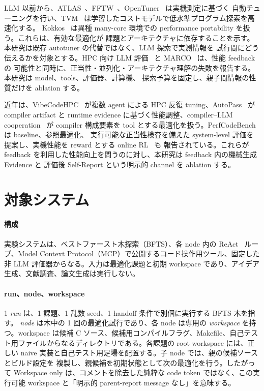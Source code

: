 \documentclass[conference,letterpaper]{IEEEtran}
\newcommand{\armW}{Workspace only}
\begin{document}
LLM 以前から、ATLAS~\cite{atlas}、FFTW~\cite{fftw}、OpenTuner~\cite{opentuner} は実機測定に基づく
自動チューニングを行い、TVM~\cite{tvm} は学習したコストモデルで低水準プログラム探索を高速化する。
Kokkos~\cite{kokkos} は異種 many-core 環境での performance portability を扱う。これらは、有効な最適化が
課題とアーキテクチャに依存することを示す。本研究は既存 autotuner の代替ではなく、LLM 探索で実測情報を
試行間にどう伝えるかを対象とする。HPC 向け LLM 評価~\cite{cuihpc} と MARCO~\cite{marco} は、性能 feedback の
可能性と同時に、正当性・並列化・アーキテクチャ理解の失敗を報告する。本研究は model、tools、評価器、計算機、
探索予算を固定し、親子間情報の性質だけを ablation する。

近年は、VibeCodeHPC~\cite{vibecodehpc} が複数 agent による HPC 反復 tuning、AutoPass~\cite{autopass} が
compiler artifact と runtime evidence に基づく性能調整、compiler--LLM cooperation~\cite{compilerllm} が
compiler 構成要素を tool とする最適化を扱う。PerfCodeBench~\cite{perfcodebench} は baseline、参照最適化、
実行可能な正当性検査を備えた system-level 評価を提案し、実機性能を reward とする online RL~\cite{hpcorl} も
報告されている。これらが feedback を利用した性能向上を問うのに対し、本研究は feedback 内の機械生成 Evidence と
評価後 Self-Report という明示的 channel を ablation する。

\section{対象システム}
\paragraph{構成}
実験システムは、ベストファースト木探索（BFTS）、各 node 内の ReAct~\cite{react} ループ、Model Context
Protocol（MCP）で公開するコード操作用ツール、固定した非 LLM 評価器からなる。入力は最適化課題と初期 workspace
であり、アイデア生成、文献調査、論文生成は実行しない。

\paragraph{run、node、workspace}
1 \emph{run} は、1 課題、1 乱数 seed、1 handoff 条件で別個に実行する BFTS 木を指す。
\emph{node} は木中の 1 回の最適化試行であり、各 node は専用の \emph{workspace} を持つ。workspace は候補
C ソース、候補用コンパイルフラグ、Makefile、自己テスト用ファイルからなるディレクトリである。各課題の root
workspace には、正しい naive 実装と自己テスト用足場を配置する。子 node では、親の候補ソースとビルド設定を
複製し、親候補を初期状態として次の最適化を行う。したがって \armW{} は、コメントを除去した純粋な code token
ではなく、この実行可能 workspace と「明示的 parent-report message なし」を意味する。
\end{document}
